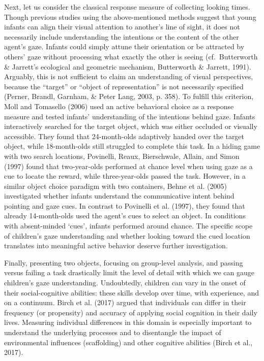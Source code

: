 \documentclass[
  man,mask,floatsintext]{apa6}
\begin{document}
Next, let us consider the classical response measure of collecting looking times. Though previous studies using the above-mentioned methods suggest that young infants can align their visual attention to another's line of sight, it does not necessarily include understanding the intentions or the content of the other agent's gaze. Infants could simply attune their orientation or be attracted by others' gaze without processing what exactly the other is seeing (cf.~Butterworth \& Jarrett's ecological and geometric mechanism, Butterworth \& Jarrett, 1991). Arguably, this is not sufficient to claim an understanding of visual perspectives, because the ``target'' or ``object of representation'' is not necessarily specified (Perner, Brandl, Garnham, \& Peter Lang, 2003, p. 358). To fulfill this criterion, Moll and Tomasello (2006) used an active behavioral choice as a response measure and tested infants' understanding of the intentions behind gaze. Infants interactively searched for the target object, which was either occluded or visually accessible. They found that 24-month-olds adaptively handed over the target object, while 18-month-olds still struggled to complete this task. In a hiding game with two search locations, Povinelli, Reaux, Bierschwale, Allain, and Simon (1997) found that two-year-olds performed at chance level when using gaze as a cue to locate the reward, while three-year-olds passed the task. However, in a similar object choice paradigm with two containers, Behne et al. (2005) investigated whether infants understand the communicative intent behind pointing and gaze cues. In contrast to Povinelli et al. (1997), they found that already 14-month-olds used the agent's cues to select an object. In conditions with absent-minded `cues', infants performed around chance. The specific scope of children's gaze understanding and whether looking toward the cued location translates into meaningful active behavior deserve further investigation.

Finally, presenting two objects, focusing on group-level analysis, and passing versus failing a task drastically limit the level of detail with which we can gauge children's gaze understanding. Undoubtedly, children can vary in the onset of their social-cognitive abilities: these skills develop over time, with experience, and on a continuum. Birch et al. (2017) argued that individuals can differ in their frequency (or propensity) and accuracy of applying social cognition in their daily lives. Measuring individual differences in this domain is especially important to understand the underlying processes and to disentangle the impact of environmental influences (scaffolding) and other cognitive abilities (Birch et al., 2017).
\end{document}
